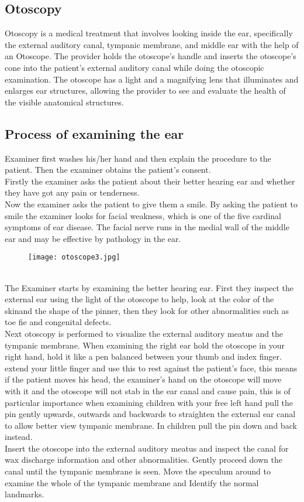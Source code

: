 \documentclass[12pt]{article}
\begin{document}
\subsection{Otoscopy}
Otoscopy is a medical treatment that involves looking inside the ear, specifically the external auditory canal, tympanic membrane, and middle ear with the help of an Otoscope. The provider holds the otoscope's handle and inserts the otoscope's cone into the patient's external auditory canal while doing the otoscopic examination. The otoscope has a light and a magnifying lens that illuminates and enlarges ear structures, allowing the provider to see and evaluate the health of the visible anatomical structures.

\subsection{Process of examining the ear}
Examiner first washes his/her hand and then explain the procedure to the patient. Then the examiner obtains the patient's consent.\\
Firstly the examiner asks the patient about their better hearing ear and whether they have got any pain or tenderness.\\
Now the examiner asks the patient to give them a smile. By asking the patient to smile the examiner looks for facial weakness, which is one of the five cardinal symptoms of ear disease. The facial nerve runs in the medial wall of the middle ear and may be effective by pathology in the ear.
\\
\begin{figure}[h]
\centering
\texttt{[image: otoscope3.jpg]}
\label{fig_otoscope3}
\end{figure}
\\
The Examiner starts by examining the better hearing ear. First they inspect the external ear using the light of the otoscope to help, look at the color of the skinand the shape of the pinner, then they look for other abnormalities such as toe fie and congenital defects.\\
Next otoscopy is performed to visualize the external auditory meatus and the tympanic membrane. When examining the right ear hold the otoscope in your right hand, hold it like a pen balanced between your thumb and index finger. extend your little finger and use this to rest against the patient's face, this means if the patient moves his head, the examiner's hand on the otoscope will move with it and the otoscope will not stab in the ear canal and cause pain, this is of particular importance when examining children with your free left hand pull the pin gently upwards, outwards and backwards to straighten the external ear canal to allow better view tympanic membrane. In children pull the pin down and back instead.\\
Insert the otoscope into the external auditory meatus and inspect the canal for wax discharge information and other abnormalities. Gently proceed down the canal until the tympanic membrane is seen. Move the speculum around to examine the whole of the tympanic membrane and Identify the normal landmarks.
\end{document}
